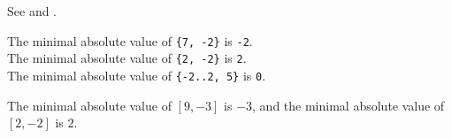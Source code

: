 
See  and .




The minimal absolute value of \verb|{7, -2}| is \verb|-2|.\\
%
The minimal absolute value of \verb|{2, -2}| is \verb|2|.\\
%
The minimal absolute value of \verb|{-2..2, 5}| is \verb|0|.




The minimal absolute value of $[9, -3]$ is $-3$,
and the minimal absolute value of $[2, -2]$ is $2$.


